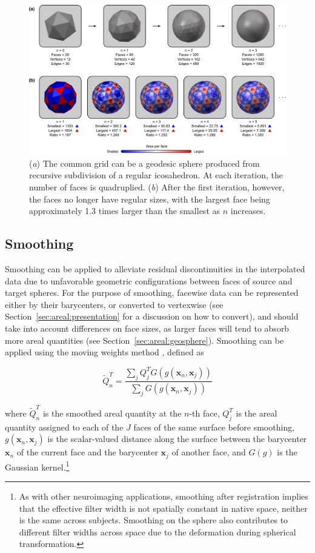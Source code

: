 \begin{figure}[!t]  %
\centering
\includegraphics[width=14cm]{images/geosphere.png}
\caption[Geodesic spheres.]{(\emph{a}) The common grid can be a geodesic sphere produced from recursive subdivision of a regular icosahedron. At each iteration, the number of faces is quadruplied. (\emph{b}) After the first iteration, however, the faces no longer have regular sizes, with the largest face being approximately 1.3 times larger than the smallest as $n$ increases.}
\label{fig:areal:geosphere}
\end{figure}

\subsection{Smoothing}
\label{sec:areal:smoothing}

Smoothing can be applied to alleviate residual discontinuities in the interpolated data due to unfavorable geometric configurations between faces of source and target spheres. For the purpose of smoothing, facewise data can be represented either by their barycenters, or converted to vertexwise (see Section~\ref{sec:areal:presentation} for a discussion on how to convert), and should take into account differences on face sizes, as larger faces will tend to absorb more areal quantities (see Section~\ref{sec:areal:geosphere}). Smoothing can be applied using the moving weights method \citep{Lombardi2002}, defined as

\begin{equation}
\tilde{Q}^{T}_n = \frac{\sum_j Q^{T}_j G(g(\mathbf{x}_n,\mathbf{x}_j))}{\sum_j G(g(\mathbf{x}_n,\mathbf{x}_j))}
\end{equation}

\noindent where $\tilde{Q}^{T}_n$ is the smoothed areal quantity at the $n$-th face, $Q^{T}_j$ is the areal quantity assigned to each of the $J$ faces of the same surface before smoothing, $g(\mathbf{x}_n,\mathbf{x}_j)$ is the scalar-valued distance along the surface between the barycenter $\mathbf{x}_n$ of the current face and the barycenter $\mathbf{x}_j$ of another face, and $G(g)$ is the Gaussian kernel.\footnote{As with other neuroimaging applications, smoothing after registration implies that the effective filter width is not spatially constant in native space, neither is the same across subjects. Smoothing on the sphere also contributes to different filter widths across space due to the deformation during spherical transformation.}

